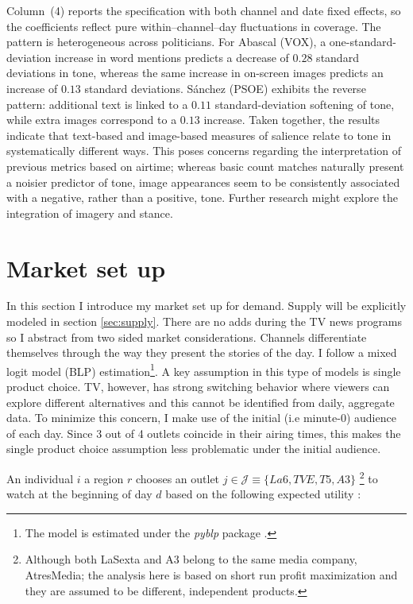 \documentclass[12pt]{article}
\begin{document}
Column~(4) reports the specification with both channel and date fixed effects, so the coefficients reflect pure within–channel–day fluctuations in coverage. The pattern is heterogeneous across politicians. For Abascal (VOX), a one-standard-deviation increase in word mentions predicts a decrease of $0.28$ standard deviations in tone, whereas the same increase in on-screen images predicts an increase of $0.13$ standard deviations. Sánchez (PSOE) exhibits the reverse pattern: additional text is linked to a $0.11$ standard-deviation softening of tone, while extra images correspond to a $0.13$ increase. Taken together, the results indicate that text-based and image-based measures of salience relate to tone in systematically different ways. This poses concerns regarding the interpretation of previous metrics based on airtime; whereas basic count matches naturally present a noisier predictor of tone, image appearances seem to be consistently associated with a negative, rather than a positive, tone. Further research might explore the integration of imagery and stance.



	
	
	
	\section{Market set up}\label{section:market}
	
In this section I introduce my market set up for demand. Supply will be explicitly modeled in section \ref{sec:supply}. There are no adds during the TV news programs so I abstract from two sided market considerations. Channels differentiate themselves through the way they present the stories of the day. I follow a mixed logit model \citep{berry1994estimating} (BLP) estimation\footnote{The model is estimated under the \textit{pyblp} package \citep{conlon2020best}.}. A key assumption in this type of models is single product choice. TV, however, has strong switching behavior where viewers can explore different alternatives and this cannot be identified from daily, aggregate data. To minimize this concern, I make use of the initial (i.e minute-0) audience of each day. Since 3 out of 4 outlets coincide in their airing times, this makes the single product choice assumption less problematic under the initial audience. 

	An individual $ i $  a region $r$ chooses an outlet $ j \in \mathcal{J}\equiv \{La6,TVE,T5,A3\}$ \footnote{Although both LaSexta and A3 belong to the same media company, AtresMedia; the analysis here is based on short run profit maximization and they are assumed to be different, independent products. } to watch at the beginning of day $d$ based on the following expected utility : 
	
\end{document}
